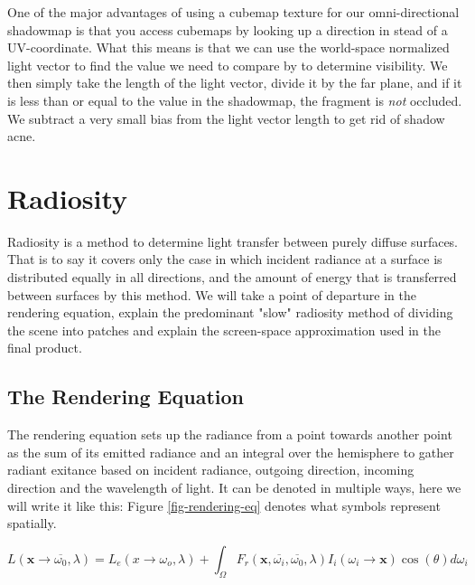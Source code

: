 One of the major advantages of using a cubemap texture for our omni-directional shadowmap is that you access cubemaps by looking up a direction in stead of a UV-coordinate. What this means is that we can use the world-space normalized light vector to find the value we need to compare by to determine visibility. We then simply take the length of the light vector, divide it by the far plane, and if it is less than or equal to the value in the shadowmap, the fragment is \emph{not} occluded. We subtract a very small bias from the light vector length to get rid of shadow acne.

\section{Radiosity}
\label{section-radiosity}
Radiosity is a method to determine light transfer between purely diffuse surfaces. That is to say it covers only the case in which incident radiance at a surface is distributed equally in all directions, and the amount of energy that is transferred between surfaces by this method. We will take a point of departure in the rendering equation, explain the predominant "slow" radiosity method of dividing the scene into patches and explain the screen-space approximation used in the final product.

\subsection{The Rendering Equation}
\label{section-renderingequation}
The rendering equation sets up the radiance from a point towards another point as the sum of its emitted radiance and an integral over the hemisphere to gather radiant exitance based on incident radiance, outgoing direction, incoming direction and the wavelength of light. It can be denoted in multiple ways, here we will write it like this: Figure \ref{fig-rendering-eq} denotes what symbols represent spatially.

$$L(\mathbf{x} \rightarrow \overline{\omega_0},\lambda) = L_e(x \rightarrow \omega_o,\lambda) + \int_\Omega F_r(\mathbf{x},\overline{\omega_i},\overline{\omega_0},\lambda) I_i(\omega_i \rightarrow \mathbf{x}) \cos(\theta) d\omega_i$$

